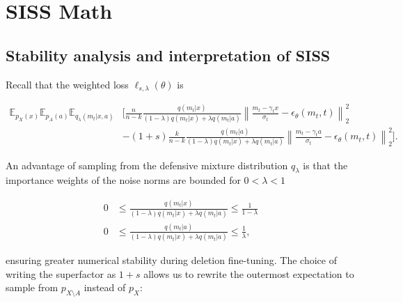 \documentclass{article} \usepackage{iclr2025_conference,times}
\begin{document}



\appendix
\section{SISS Math}

\subsection{Stability analysis and interpretation of SISS}
\label{apndx:siss_math}
Recall that the weighted loss $\ell_{s,\lambda}(\theta)$ is

\begin{align*}
\mathbb{E}_{p_X(x)} \mathbb{E}_{p_A(a)} \mathbb{E}_{q_\lambda\left(m_t| x, a\right)}
&\Bigg[\frac{n}{n-k} \frac{q\left(m_t| x\right)}{(1-\lambda) q\left(m_t| x\right)+\lambda q\left(m_t| a\right)}\left\|\frac{m_t-\gamma_t x}{\sigma_t}-\epsilon_\theta(m_t, t)\right\|_2^2 \nonumber\\
& -(1+s)\frac{k}{n-k} \frac{q\left(m_t| a\right)}{(1-\lambda) q\left(m_t| x\right)+\lambda q\left(m_t| a\right)}\left\|\frac{m_t-\gamma_t a}{\sigma_t}-\epsilon_\theta(m_t, t)\right\|_2^2\Bigg]\nonumber.
\end{align*}

An advantage of sampling from the defensive mixture distribution $q_\lambda$ is that the importance weights of the noise norms are bounded for $0<\lambda<1$

\begin{align}
0 & \leq \frac{q\left(m_t| x\right)}{(1-\lambda) q\left(m_t| x\right)+\lambda q\left(m_t| a\right)} \leq \frac{1}{1-\lambda} \\
0 & \leq \frac{q\left(m_t| a\right)}{(1-\lambda) q\left(m_t| x\right)+\lambda q\left(m_t| a\right)} \leq \frac{1}{\lambda},
\end{align}

ensuring greater numerical stability during deletion fine-tuning. The choice of writing the superfactor as $1+s$ allows us to rewrite the outermost expectation to sample from $p_{X\setminus A}$ instead of $p_X$:
\end{document}
